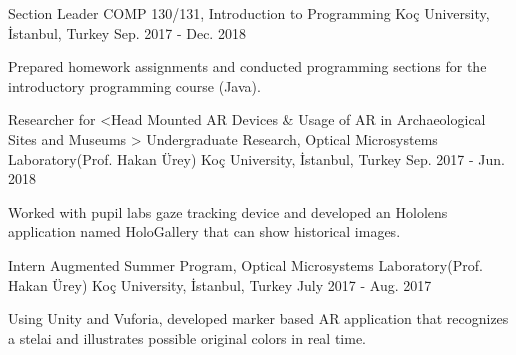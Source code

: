 
\vspace*{-1.5mm}
\begin{cventries}

  \cventry
    {Section Leader}%
    {COMP 130/131, Introduction to Programming}%
    {Koç University, İstanbul, Turkey}
    {Sep. 2017 - Dec. 2018}
    {
      \begin{cvitems}
        \item {Prepared homework assignments and conducted programming sections for the introductory programming course (Java).}
      \end{cvitems}
    }


  \cventry
    {Researcher for <Head Mounted AR Devices \& Usage of AR in Archaeological Sites and Museums >}%
     {Undergraduate Research, Optical Microsystems Laboratory(Prof. Hakan Ürey)}%
    {Koç University, İstanbul, Turkey}
    {Sep. 2017 - Jun. 2018}
    {
      \begin{cvitems}
	\item {Worked with pupil labs gaze tracking device and developed an Hololens application named HoloGallery that can show historical images.}
      \end{cvitems} 
    }

  \cventry
    {Intern}
    {Augmented Summer Program, Optical Microsystems Laboratory(Prof. Hakan Ürey)}
    {Koç University, İstanbul, Turkey}
    {July 2017 - Aug. 2017}
    {
      \begin{cvitems}
        \item {Using Unity and Vuforia, developed marker based AR application that recognizes a stelai and illustrates possible original colors in real time.}
      \end{cvitems}
    }


\end{cventries}
